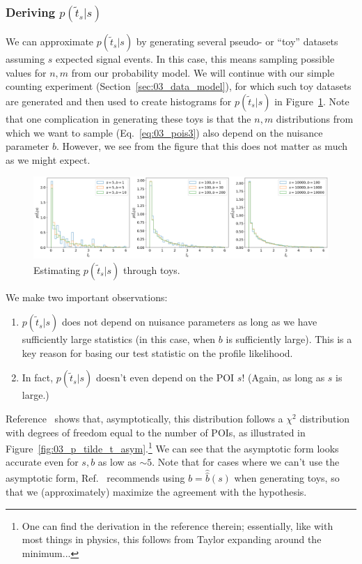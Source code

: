 \subsubsection{Deriving \texorpdfstring{$p(\tilde{t}_s|s)$}{p(ts|s)}}

We can approximate $p(\tilde{t}_s|s)$ by generating several pseudo- or ``toy'' datasets assuming $s$ expected signal events.
In this case, this means sampling possible values for $n, m$ from our probability model.
We will continue with our simple counting experiment (Section~\ref{sec:03_data_model}), for which such toy datasets are generated and then used to create histograms for $p(\tilde{t}_s|s)$ in Figure~\ref{fig:03_p_tilde_t}.
Note that one complication in generating these toys is that the $n, m$ distributions from which we want to sample (Eq.~\ref{eq:03_pois3}) also depend on the nuisance parameter $b$.
However, we see from the figure that this does not matter as much as we might expect.

\begin{figure}[htb]
\centering
\includegraphics[width=\textwidth]{figures/03-Stats/02-hypothesis-testing/1.png}
\captionsetup{justification=centering}
\caption{Estimating $p(\tilde{t}_s|s)$ through toys.}
\label{fig:03_p_tilde_t}
\end{figure}

We make two important observations:
\begin{enumerate}
    \item $p(\tilde{t}_s|s)$ does not depend on nuisance parameters as long as we have sufficiently large statistics (in this case, when $b$ is sufficiently large).
    This is a key reason for basing our test statistic on the profile likelihood.
    \item In fact, $p(\tilde{t}_s|s)$ doesn't even depend on the POI $s$! (Again, as long as $s$ is large.)
\end{enumerate}

Reference~\cite{Cowan:2010js} shows that, asymptotically, this distribution follows a $\chi^2$ distribution with degrees of freedom equal to the number of POIs, as illustrated in Figure~\ref{fig:03_p_tilde_t_asym}.\footnote{One can find the derivation in the reference therein; essentially, like with most things in physics, this follows from Taylor expanding around the minimum...}
We can see that the asymptotic form looks accurate even for $s, b$ as low as $\sim5$.
Note that for cases where we can't use the asymptotic form, Ref.~\cite{Cranmer:2014lly} recommends using $b = \hat{\hat{b}}(s)$ when generating toys, so that we (approximately) maximize the agreement with the hypothesis.


